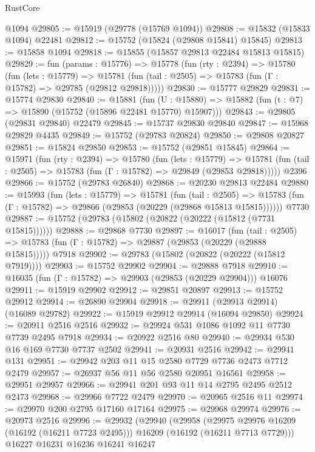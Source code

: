 \begin{lexlean}{RustCore}
\begin{coremodule}
    @1094
@29805 := @15919 (@29778 (@15769 @1094))
@29808 := @15832 (@15833 @1094) @22481
@29812 := @15752 (@15824 (@29808 @15841) @15845)
@29813 := @15858 @1094
@29818 := @15855 (@15857 @29813 @22484 @15813 @15815)
@29829 := fun (params : @15776) =>
  @15778
    (fun (rty : @2394) =>
    @15780
      (fun (lets : @15779) =>
      @15781 (fun (tail : @2505) => @15783 (fun (Γ : @15782) => @29785 (@29812 @29818)))))
@29830 := @15777 @29829
@29831 := @15774 @29830
@29840 := @15881
    (fun (U : @15880) => @15882 (fun (t : @7) => @15890 (@15752 (@15896 @22481 @15770) @15907)))
@29843 := @29805 (@29831 @29840) @22479
@29845 := @15737 @29830 @29840
@29847 := @15968 @29829 @4435
@29849 := @15752 (@29783 @20824)
@29850 := @29808 @20827
@29851 := @15824 @29850
@29853 := @15752 (@29851 @15845)
@29864 := @15971
    (fun (rty : @2394) =>
    @15780
      (fun (lets : @15779) =>
      @15781 (fun (tail : @2505) => @15783 (fun (Γ : @15782) => @29849 (@29853 @29818)))))
    @2396
@29866 := @15752 (@29783 @26840)
@29868 := @20230 @29813 @22484
@29880 := @15993
    (fun (lets : @15779) =>
    @15781
      (fun (tail : @2505) =>
      @15783 (fun (Γ : @15782) => @29866 (@29853 (@20229 (@29868 @15813 @15815))))))
    @7730
@29887 := @15752 (@29783 (@15802 (@20822 (@20222 (@15812 (@7731 @15815))))))
@29888 := @29868 @7730
@29897 := @16017
    (fun (tail : @2505) => @15783 (fun (Γ : @15782) => @29887 (@29853 (@20229 (@29888 @15815)))))
    @7918
@29902 := @29783 (@15802 (@20822 (@20222 (@15812 @7919))))
@29903 := @15752 @29902
@29904 := @29888 @7918
@29910 := @16035 (fun (Γ : @15782) => @29903 (@29853 (@20229 @29904))) @16076
@29911 := @15919 @29902
@29912 := @29851 @20897
@29913 := @15752 @29912
@29914 := @26890 @29904
@29918 := @29911 (@29913 @29914) (@16089 @29782)
@29922 := @15919 @29912 @29914 (@16094 @29850)
@29924 := @20911 @2516 @2516
@29932 := @29924 @531 @1086 @1092 @11 @7730 @7739 @2495 @7918
@29934 := @20922 @2516 @80
@29940 := @29934 @530 @16 @169 @7730 @7737 @2502
@29941 := @20931 @2516
@29942 := @29941 @131
@29951 := @29942 @203 @11 @15 @2580 @7729 @7736 @2473 @7712 @2479
@29957 := @26937 @56 @11 @56 @2580 @20951 @16561
@29958 := @29951 @29957
@29966 := @29941 @201 @93 @11 @14 @2795 @2495 @2512 @2473
@29968 := @29966 @7722 @2479
@29970 := @20965 @2516 @11
@29974 := @29970 @200 @2795 @17160 @17164
@29975 := @29968 @29974
@29976 := @20973 @2516
@29996 := @29932
    (@29940
      (@29958
        (@29975 @29976 @16209 (@16192 (@16211 @7723 @2495)))
        @16209
        (@16192 (@16211 @7713 @7729)))
      @16227
      @16231
      @16236
      @16241
      @16247

\end{coremodule}
\end{lexlean}

